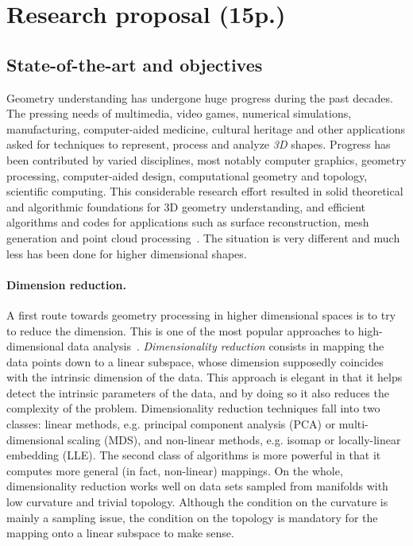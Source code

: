 \section{Research proposal (15p.)}

\subsection{State-of-the-art and objectives}

Geometry understanding has undergone huge progress during the past decades. The pressing needs
of multimedia, video games, numerical simulations, manufacturing, computer-aided medicine, cultural heritage and other applications asked for techniques to represent, process and analyze
{\em 3D} shapes.  Progress has been contributed by  varied disciplines, most notably computer graphics, geometry processing, computer-aided design, computational geometry and topology, scientific computing. This considerable research effort resulted in solid theoretical and algorithmic foundations for 3D geometry understanding, and efficient algorithms and codes for applications such as surface reconstruction, mesh generation and point cloud processing~\cite{he-gtmg-2001,geometrica-bcmrv-ms-06,dey-csr-2007}.  
The situation is very different and much less has been done for higher dimensional shapes.%


\paragraph{Dimension reduction.} A first route towards geometry processing in higher dimensional spaces is to try to reduce the dimension. This is 
one of the most popular approaches to high-dimensional data analysis~\cite{hs-fmmds-2006,lv-nldr-2007}. {\em Dimensionality reduction} consists in mapping the data points down to a linear subspace, whose dimension supposedly coincides with the intrinsic dimension of the data. This approach is elegant in that it helps detect the intrinsic parameters of the data, and by doing so it also reduces the complexity of the problem. Dimensionality reduction techniques fall into two classes: linear methods, e.g. principal component analysis (PCA) or multi-dimensional scaling (MDS), and non-linear methods, e.g. isomap or locally-linear embedding (LLE). The second class of algorithms is more powerful in that it computes more general (in fact, non-linear) mappings. On the whole, dimensionality reduction works well on data sets sampled from manifolds with low curvature and trivial topology. Although the condition on the curvature is mainly a sampling issue, the condition on the topology is mandatory for the mapping onto a linear subspace to make sense. 

